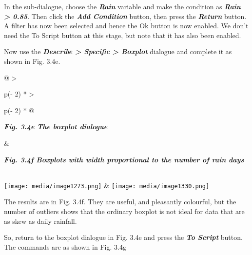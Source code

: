 \documentclass[
  letterpaper,
  DIV=11,
  numbers=noendperiod]{scrreprt}
\begin{document}
In the sub-dialogue, choose the \textbf{\emph{Rain}} variable and make
the condition as \textbf{\emph{Rain \textgreater{} 0.85}}. Then click
the \textbf{\emph{Add Condition}} button, then press the
\textbf{\emph{Return}} button. A filter has now been selected and hence
the Ok button is now enabled. We don't need the To Script button at this
stage, but note that it has also been enabled.

Now use the \textbf{\emph{Describe \textgreater{} Specific
\textgreater{} Boxplot}} dialogue and complete it as shown in Fig. 3.4e.

\begin{longtable}[]{@{}
  >{\raggedright\arraybackslash}p{(\columnwidth - 2\tabcolsep) * }
  >{\raggedright\arraybackslash}p{(\columnwidth - 2\tabcolsep) * }@{}}
\toprule\noalign{}
\begin{minipage}[b]{\linewidth}\raggedright
\textbf{\emph{Fig. 3.4e The boxplot dialogue}}
\end{minipage} & \begin{minipage}[b]{\linewidth}\raggedright
\textbf{\emph{Fig. 3.4f Boxplots with width proportional to the number
of rain days}}
\end{minipage} \\
\midrule\noalign{}
\endhead
\bottomrule\noalign{}
\endlastfoot
\texttt{[image: media/image1273.png]}
& \texttt{[image: media/image1330.png]} \\
\end{longtable}

The results are in Fig. 3.4f. They are useful, and pleasantly colourful,
but the number of outliers shows that the ordinary boxplot is not ideal
for data that are as skew as daily rainfall.

So, return to the boxplot dialogue in Fig. 3.4e and press the
\textbf{\emph{To Script}} button. The commands are as shown in Fig. 3.4g
\end{document}
